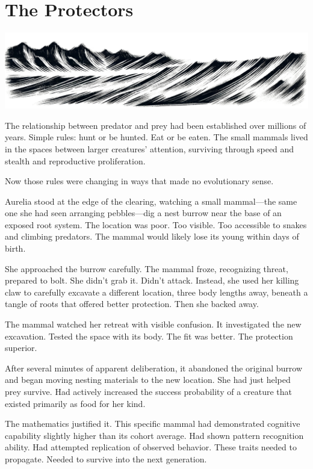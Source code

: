 \chapter{The Protectors}
\label{ch:06}



\begin{center}
\includegraphics[width=\textwidth]{images/chapterImages/genesis_sketch_00069_.png}
\end{center}

The relationship between predator and prey had been established over millions of years. Simple rules: hunt or be hunted. Eat or be eaten. The small mammals lived in the spaces between larger creatures' attention, surviving through speed and stealth and reproductive proliferation.

Now those rules were changing in ways that made no evolutionary sense.

Aurelia stood at the edge of the clearing, watching a small mammal—the same one she had seen arranging pebbles—dig a nest burrow near the base of an exposed root system. The location was poor. Too visible. Too accessible to snakes and climbing predators. The mammal would likely lose its young within days of birth.

She approached the burrow carefully. The mammal froze, recognizing threat, prepared to bolt. She didn't grab it. Didn't attack. Instead, she used her killing claw to carefully excavate a different location, three body lengths away, beneath a tangle of roots that offered better protection. Then she backed away.

The mammal watched her retreat with visible confusion. It investigated the new excavation. Tested the space with its body. The fit was better. The protection superior.

After several minutes of apparent deliberation, it abandoned the original burrow and began moving nesting materials to the new location. She had just helped prey survive. Had actively increased the success probability of a creature that existed primarily as food for her kind.

The mathematics justified it. This specific mammal had demonstrated cognitive capability slightly higher than its cohort average. Had shown pattern recognition ability. Had attempted replication of observed behavior. These traits needed to propagate. Needed to survive into the next generation.

